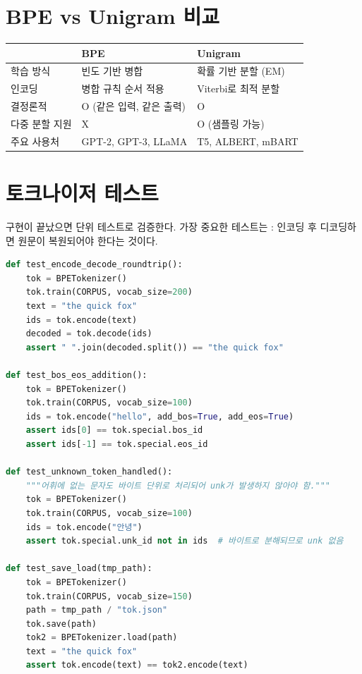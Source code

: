 \section{BPE vs Unigram 비교}

\begin{center}
\begin{tabularx}{\textwidth}{lXX}
\toprule
 & \textbf{BPE} & \textbf{Unigram} \\
\midrule
학습 방식 & 빈도 기반 병합 & 확률 기반 분할 (EM) \\
인코딩 & 병합 규칙 순서 적용 & Viterbi로 최적 분할 \\
결정론적 & O (같은 입력, 같은 출력) & O \\
다중 분할 지원 & X & O (샘플링 가능) \\
주요 사용처 & GPT-2, GPT-3, LLaMA & T5, ALBERT, mBART \\
\bottomrule
\end{tabularx}
\end{center}

\section{토크나이저 테스트}

구현이 끝났으면 단위 테스트로 검증한다. 가장 중요한 테스트는 : 인코딩 후 디코딩하면 원문이 복원되어야 한다는 것이다.

\begin{lstlisting}[language=Python]
def test_encode_decode_roundtrip():
    tok = BPETokenizer()
    tok.train(CORPUS, vocab_size=200)
    text = "the quick fox"
    ids = tok.encode(text)
    decoded = tok.decode(ids)
    assert " ".join(decoded.split()) == "the quick fox"

def test_bos_eos_addition():
    tok = BPETokenizer()
    tok.train(CORPUS, vocab_size=100)
    ids = tok.encode("hello", add_bos=True, add_eos=True)
    assert ids[0] == tok.special.bos_id
    assert ids[-1] == tok.special.eos_id

def test_unknown_token_handled():
    """어휘에 없는 문자도 바이트 단위로 처리되어 unk가 발생하지 않아야 함."""
    tok = BPETokenizer()
    tok.train(CORPUS, vocab_size=100)
    ids = tok.encode("안녕")
    assert tok.special.unk_id not in ids  # 바이트로 분해되므로 unk 없음

def test_save_load(tmp_path):
    tok = BPETokenizer()
    tok.train(CORPUS, vocab_size=150)
    path = tmp_path / "tok.json"
    tok.save(path)
    tok2 = BPETokenizer.load(path)
    text = "the quick fox"
    assert tok.encode(text) == tok2.encode(text)
\end{lstlisting}

